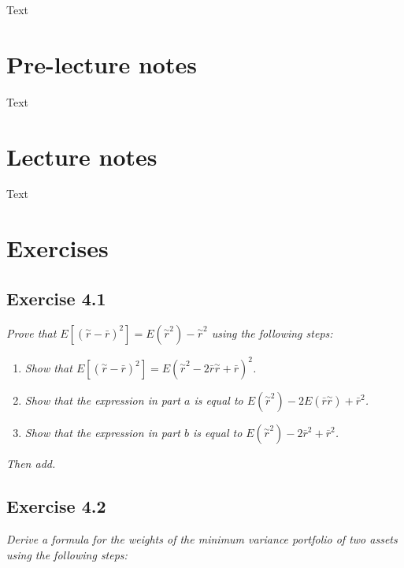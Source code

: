 \documentclass[]{book}
\theoremstyle{definition}
\theoremstyle{definition}
\theoremstyle{remark}
\begin{document}
Text

\section{Pre-lecture notes}\label{pre-lecture-notes-3}

Text

\section{Lecture notes}\label{lecture-notes-3}

Text

\section{Exercises}\label{exercises-3}

\subsection{Exercise 4.1}\label{exercise-4.1}

\emph{Prove that
\(E\left[\left(\overset{\sim}{r}- \bar{r}\right)^2\right] = E\left(\overset{\sim}{r}^2\right) - \overset{\sim}{r}^2\)
using the following steps:} \citep[p.116]{book}

\begin{enumerate}
\def\labelenumi{\alph{enumi}.}
\item
  \emph{Show that
  \(E\left[\left(\overset{\sim}{r} -\bar{r}\right)^2\right] = E\left(\overset{\sim}{r}^2-2\bar{r}\overset{\sim}{r}+\bar{r}\right)^2\).}
  \citep[p.116]{book}
\item
  \emph{Show that the expression in part \(a\) is equal to
  \(E\left(\overset{\sim}{r}^2\right)-2E\left(\bar{r}\overset{\sim}{r}\right)+\bar{r}^2\).}
  \citep[p.116]{book}
\item
  \emph{Show that the expression in part \(b\) is equal to
  \(E\left(\overset{\sim}{r}^2\right)-2\bar{r}^2+\bar{r}^2\).}
  \citep[p.116]{book}
\end{enumerate}

\emph{Then add.} \citep[p.116]{book}

\subsection{Exercise 4.2}\label{exercise-4.2}

\emph{Derive a formula for the weights of the minimum variance portfolio
of two assets using the following steps:} \citep[p.117]{book}
\end{document}

